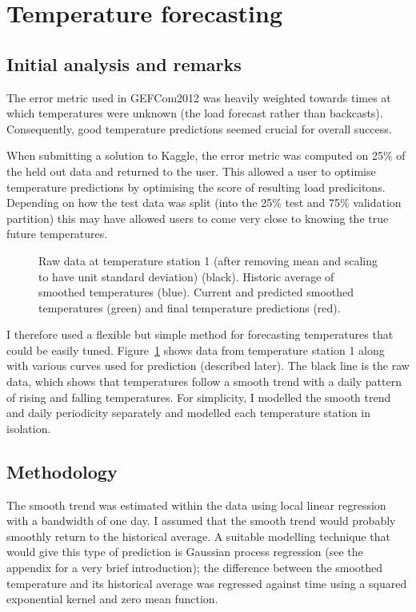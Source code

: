 \documentclass[preprint,authoryear,12pt]{elsarticle}
\begin{document}
\section{Temperature forecasting}

\subsection{Initial analysis and remarks}

The error metric used in GEFCom2012 was heavily weighted towards times at which temperatures were unknown (\ie the load forecast rather than backcasts).
Consequently, good temperature predictions seemed crucial for overall success.

When submitting a solution to Kaggle, the error metric was computed on 25\% of the held out data and returned to the user.
This allowed a user to optimise temperature predictions by optimising the score of resulting load predicitons.
Depending on how the test data was split (into the 25\% test and 75\% validation partition) this may have allowed users to come very close to knowing the true future temperatures.

\begin{figure}[ht]
  \begin{center}
    
  \end{center}
  \caption{Raw data at temperature station 1 (after removing mean and scaling to have unit standard deviation) (black). Historic average of smoothed temperatures (blue). Current and predicted smoothed temperatures (green) and final temperature predictions (red).}
  \label{fig:temp_pred}
\end{figure}

I therefore used a flexible but simple method for forecasting temperatures that could be easily tuned.
Figure~\ref{fig:temp_pred} shows data from temperature station 1 along with various curves used for prediction (described later).
The black line is the raw data, which shows that temperatures follow a smooth trend with a daily pattern of rising and falling temperatures.
For simplicity, I modelled the smooth trend and daily periodicity separately and modelled each temperature station in isolation.

\subsection{Methodology}

The smooth trend was estimated within the data using local linear regression \citep[e.g. chapter 6 of][]{Hastie2009} with a bandwidth of one day.
I assumed that the smooth trend would probably smoothly return to the historical average.
A suitable modelling technique that would give this type of prediction is Gaussian process regression \citep[e.g.][]{Rasmussen2006} (see the appendix for a very brief introduction); the difference between the smoothed temperature and its historical average was regressed against time using a squared exponential kernel and zero mean function.
\end{document}
